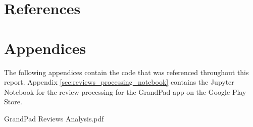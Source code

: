 \documentclass[12pt]{article}
\begin{document}
    \setlength\fboxsep{5pt}
    \setlength{\fboxrule}{1pt}
    \restoregeometry

    \markboth{}{}
    {\hypersetup{linkcolor=black}
        \tableofcontents
        \thispagestyle{fancy}
    }
    \markboth{}{}

    \pagebreak

    

    

    

    \fancyhead{}

    \part*{References}
    \begingroup
        \def\section*#1{}
        
        
    \endgroup

    \pagebreak

    \part*{Appendices}
        \begin{appendices}
            The following appendices contain the code that was referenced
                throughout this report.
            Appendix \ref{sec:reviews_processing_notebook} contains the Jupyter
                Notebook for the review processing for the GrandPad app on the
                Google Play Store.

            
            {GrandPad Reviews Analysis.pdf}
        \end{appendices}
\end{document}
